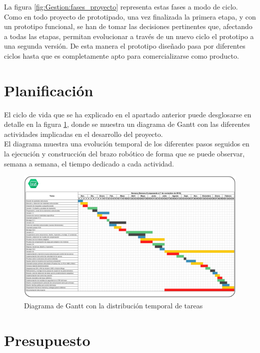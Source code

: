 La figura \ref{fig:Gestion:fases_proyecto} representa estas fases a modo de ciclo. Como en todo proyecto de prototipado, una vez finalizada la primera etapa, y con un prototipo funcional, se han de tomar las decisiones pertinentes que, afectando a todas las etapas, permitan evolucionar a través de un nuevo ciclo el prototipo a una segunda versión. De esta manera el prototipo diseñado pasa por diferentes ciclos hasta que es completamente apto para comercializarse como producto.

\section{Planificación} \label{gestion:planificacion}

El ciclo de vida que se ha explicado en el apartado anterior puede desglosarse en detalle en la figura \ref{fig:Gestion:gantt_tareas}, donde se muestra un diagrama de Gantt con las diferentes actividades implicadas en el desarrollo del proyecto.
\\

El diagrama muestra una evolución temporal de los diferentes pasos seguidos en la ejecución y construcción del brazo robótico de forma que se puede observar, semana a semana, el tiempo dedicado a cada actividad.
\begin{landscape}
   	\begin{figure}[H]
   		\centering
   		\includegraphics[width=1.6\textwidth]{figuras/Imagenes_Gestion/organizacion_gantt.jpg}
   		\caption{Diagrama de Gantt con la distribución temporal de tareas}
   		\label{fig:Gestion:gantt_tareas}
   	\end{figure}
\end{landscape}

\section{Presupuesto}

